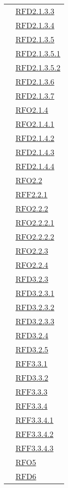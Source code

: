 \begin{longtable}{|>{\centering}m{5cm}|m{5cm}<{\centering}|}
& \hyperlink{RFD2.1.3.3}{RFD2.1.3.3}\\
& \hyperlink{RFD2.1.3.4}{RFD2.1.3.4}\\
& \hyperlink{RFD2.1.3.5}{RFD2.1.3.5}\\
& \hyperlink{RFD2.1.3.5.1}{RFD2.1.3.5.1}\\
& \hyperlink{RFD2.1.3.5.2}{RFD2.1.3.5.2}\\
& \hyperlink{RFD2.1.3.6}{RFD2.1.3.6}\\
& \hyperlink{RFD2.1.3.7}{RFD2.1.3.7}\\
& \hyperlink{RFO2.1.4}{RFO2.1.4}\\
& \hyperlink{RFO2.1.4.1}{RFO2.1.4.1}\\
& \hyperlink{RFD2.1.4.2}{RFD2.1.4.2}\\
& \hyperlink{RFD2.1.4.3}{RFD2.1.4.3}\\
& \hyperlink{RFD2.1.4.4}{RFD2.1.4.4}\\
& \hyperlink{RFO2.2}{RFO2.2}\\
& \hyperlink{RFF2.2.1}{RFF2.2.1}\\
& \hyperlink{RFO2.2.2}{RFO2.2.2}\\
& \hyperlink{RFO2.2.2.1}{RFO2.2.2.1}\\
& \hyperlink{RFO2.2.2.2}{RFO2.2.2.2}\\
& \hyperlink{RFO2.2.3}{RFO2.2.3}\\
& \hyperlink{RFO2.2.4}{RFO2.2.4}\\
& \hyperlink{RFD3.2.3}{RFD3.2.3}\\
& \hyperlink{RFD3.2.3.1}{RFD3.2.3.1}\\
& \hyperlink{RFD3.2.3.2}{RFD3.2.3.2}\\
& \hyperlink{RFD3.2.3.3}{RFD3.2.3.3}\\
& \hyperlink{RFD3.2.4}{RFD3.2.4}\\
& \hyperlink{RFD3.2.5}{RFD3.2.5}\\
& \hyperlink{RFF3.3.1}{RFF3.3.1}\\
& \hyperlink{RFD3.3.2}{RFD3.3.2}\\
& \hyperlink{RFF3.3.3}{RFF3.3.3}\\
& \hyperlink{RFF3.3.4}{RFF3.3.4}\\
& \hyperlink{RFF3.3.4.1}{RFF3.3.4.1}\\
& \hyperlink{RFF3.3.4.2}{RFF3.3.4.2}\\
& \hyperlink{RFF3.3.4.3}{RFF3.3.4.3}\\
& \hyperlink{RFO5}{RFO5}\\
& \hyperlink{RFD6}{RFD6}\\

\end{longtable}
